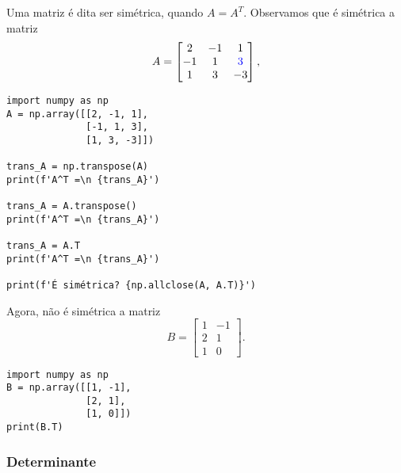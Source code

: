 \begin{ex}
  Uma matriz é dita ser simétrica, quando $A = A^T$. Observamos que é simétrica a matriz
  \begin{equation}
    A =
    \begin{bmatrix}
      2 & -1 & 1\\
      -1 & 1 & {\color{blue}3}\\
      1 & 3 & -3
    \end{bmatrix},
  \end{equation}

\begin{lstlisting}
import numpy as np
A = np.array([[2, -1, 1],
              [-1, 1, 3],
              [1, 3, -3]])

trans_A = np.transpose(A) 
print(f'A^T =\n {trans_A}')

trans_A = A.transpose() 
print(f'A^T =\n {trans_A}')

trans_A = A.T
print(f'A^T =\n {trans_A}')

print(f'É simétrica? {np.allclose(A, A.T)}')
\end{lstlisting}

  Agora, não é simétrica a matriz
  \begin{equation}
    B =
    \begin{bmatrix}
      1 & -1\\
      2 & 1\\
      1 & 0
    \end{bmatrix}.
  \end{equation}

\begin{lstlisting}
import numpy as np
B = np.array([[1, -1],
              [2, 1],
              [1, 0]])
print(B.T)
\end{lstlisting}
\end{ex}

\subsubsection{Determinante}

